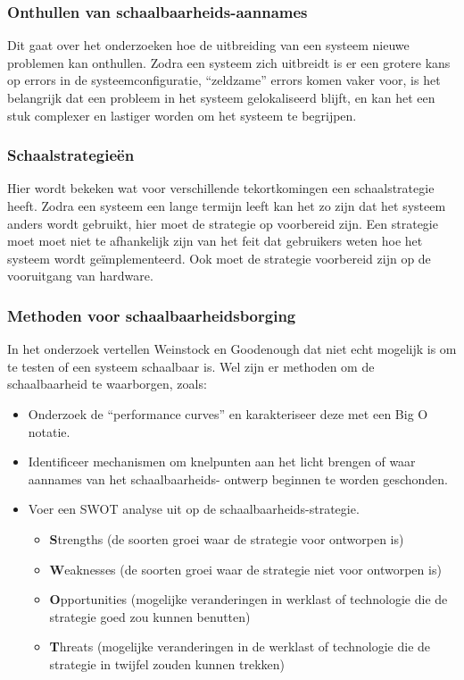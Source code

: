 \subsubsection{Onthullen van schaalbaarheids-aannames}
Dit gaat over het onderzoeken hoe de uitbreiding van een systeem nieuwe problemen kan onthullen. Zodra een systeem zich uitbreidt is er een grotere kans op errors in de systeemconfiguratie, \enquote{zeldzame} errors komen vaker voor, is het belangrijk dat een probleem in het systeem gelokaliseerd blijft, en kan het een stuk complexer en lastiger worden om het systeem te begrijpen.

\subsubsection{Schaalstrategieën}
Hier wordt bekeken wat voor verschillende tekortkomingen een schaalstrategie heeft. Zodra een systeem een lange termijn leeft kan het zo zijn dat het systeem anders wordt gebruikt, hier moet de strategie op voorbereid zijn. Een strategie moet moet niet te afhankelijk zijn van het feit dat gebruikers weten hoe het systeem wordt geïmplementeerd. Ook moet de strategie voorbereid zijn op de vooruitgang van hardware.

\subsubsection{Methoden voor schaalbaarheidsborging}
In het onderzoek vertellen Weinstock en Goodenough dat niet echt mogelijk is om te testen of een systeem schaalbaar is. Wel zijn er methoden om de schaalbaarheid te waarborgen, zoals:
\begin{itemize}
	\item Onderzoek de \enquote{performance curves} en karakteriseer deze met een Big O notatie.
	\item Identificeer mechanismen om knelpunten aan het licht brengen of waar aannames van het schaalbaarheids- ontwerp beginnen te worden geschonden.
	\item Voer een SWOT analyse uit op de schaalbaarheids-strategie.
	\begin{itemize}
		\item \textbf{S}trengths (de soorten groei waar de strategie voor ontworpen is)
		\item \textbf{W}eaknesses (de soorten groei waar de strategie niet voor ontworpen is)
		\item \textbf{O}pportunities (mogelijke veranderingen in werklast of technologie die de strategie goed zou kunnen benutten)
		\item \textbf{T}hreats (mogelijke veranderingen in de werklast of technologie die de strategie in twijfel zouden kunnen trekken)
	\end{itemize}
\end{itemize}

